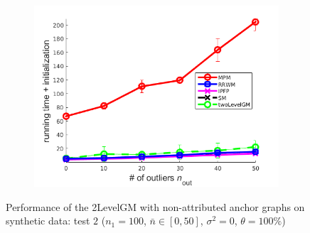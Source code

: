 \begin{figure}
\begin{subfigure}[b]{0.33\textwidth}
		\includegraphics[scale=0.25]{"chapter3/fig/SyntheticTest/no_descr/Results_v4.3.3/Test3/time_summary_avg10t"} 
	\end{subfigure} 	
	\caption[Performance of the 2LevelGM with non-attributed anchor graphs on synthetic data (test $2$)]{Performance of the 2LevelGM with non-attributed anchor graphs on synthetic data: test $2$ ($n_1=100$, $\bar{n}\in[0,50]$, $\sigma^2=0$, $\theta=100\%$)}
	\label{fig:synTest2_ver433}
\end{figure}
